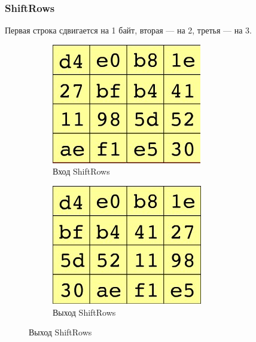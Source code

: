 \documentclass[a4paper, 14pt]{extarticle}
\begin{document}
\subsubsection{ShiftRows}
Первая строка сдвигается на 1 байт, вторая --- на 2, третья --- на 3.
\begin{figure}[h]
    \centering
    \begin{subfigure}[b]{0.3\textwidth}
    	\includegraphics[width=\textwidth]{img/S006.jpg}
    	\caption{Вход ShiftRows}
    \end{subfigure}%
    \hspace{1cm}
    \begin{subfigure}[b]{0.3\textwidth}
    	\includegraphics[width=\textwidth]{img/S007.jpg}
    	\caption{Выход ShiftRows}
    \end{subfigure}
\end{figure}
\end{document}

